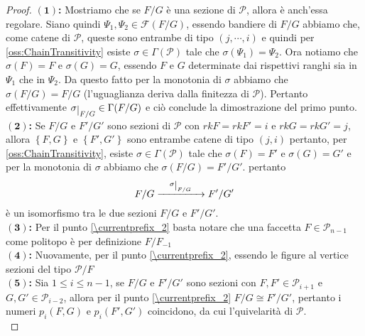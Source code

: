 \documentclass[a4paper,12pt]{report}
\newcommand{\p}{\mathcal{P}}
\theoremstyle{plain}
\theoremstyle{definition}
\newcommand\localref[1]{\ref{\currentprefix_#1}}
\newcommand\point[1]{$\bm{(#1)}$\textbf{: }}
\def\restrict#1{\raise-.5ex\hbox{\ensuremath|}_{#1}}
\begin{document}
\begin{proof}
\point{1}Mostriamo che se $F/G$ \`e una sezione di $\p$, allora \`e anch'essa regolare. Siano quindi $\Psi_1,\Psi_2\in\mathcal{F}(F/G)$, essendo
bandiere di $F/G$ abbiamo che, come catene di $\p$, queste sono entrambe di tipo $(j,\cdots,i)$ e quindi per \ref{oss:ChainTransitivity} esiste
$\sigma\in\Gamma(\p)$ tale che $\sigma(\Psi_1)=\Psi_2$. Ora notiamo che $\sigma(F)=F$ e $\sigma(G)=G$, essendo $F$ e $G$ determinate
dai rispettivi ranghi sia in $\Psi_1$ che in $\Psi_2$. Da questo fatto per la monotonia di $\sigma$ abbiamo che $\sigma(F/G)=F/G$
(l'uguaglianza deriva dalla finitezza di $\p$). Pertanto effettivamente $\sigma\restrict{F/G}\in\Gamma(F/G)$
e ci\`o conclude la dimostrazione del primo punto.\\
\point{2}Se $F/G$ e $F'/G'$ sono sezioni di $\p$ con $rkF=rkF'=i$ e $rkG=rkG'=j$, allora $\left\{F,G\right\}$ e $\left\{F',G'\right\}$ sono entrambe
catene di tipo $(j,i)$ pertanto, per \ref{oss:ChainTransitivity}, esiste $\sigma\in\Gamma(\p)$ tale che $\sigma(F)=F'$ e 
$\sigma(G)=G'$ e per la monotonia di $\sigma$ abbiamo che $\sigma(F/G)=F'/G'$. pertanto
\begin{equation*}
F/G\xrightarrow{\quad\sigma\restrict{F/G}\quad}F'/G'
\end{equation*}
\`e un isomorfismo tra le due sezioni $F/G$ e $F'/G'$.\\
\point{3}Per il punto \localref{2} basta notare che una faccetta $F\in\p_{n-1}$ come politopo \`e per definizione $F/F_{-1}$\\
\point{4}Nuovamente, per il punto \localref{2}, essendo le figure al vertice sezioni del tipo $\p/F$\\
\point{5}Sia $1\leq i\leq n-1$, se $F/G$ e $F'/G'$ sono sezioni con $F,F'\in\p_{i+1}$ e $G,G'\in\p_{i-2}$, allora
per il punto \localref{2} $F/G\cong F'/G'$, pertanto i numeri $p_i(F,G)$ e $p_i(F',G')$ coincidono, da cui l'quivelarit\`a di $\p$.\\

\end{proof}
\end{document}
